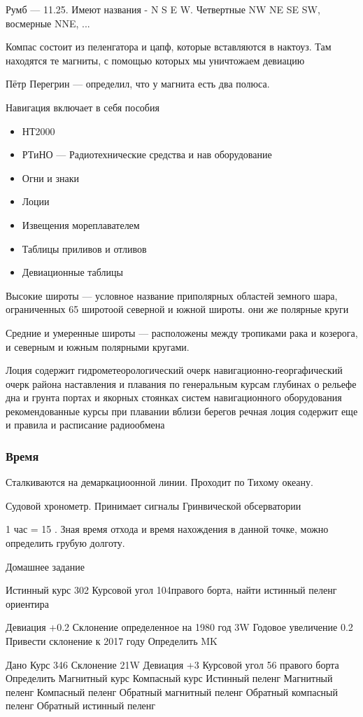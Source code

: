 \documentclass{article}        %
\begin{document}
Румб --- 11.25\degree . Имеют названия - N S E W. Четвертные NW NE SE SW, восмерные NNE, ...

Компас состоит из пеленгатора и цапф, которые вставляются в нактоуз. Там находятся те магниты, с помощью которых мы уничтожаем девиацию

Пётр Перегрин --- определил, что у магнита есть два полюса.

Навигация включает в себя пособия
\begin{itemize}
	\item НТ2000
	\item РТиНО --- Радиотехнические средства и нав оборудование
	\item Огни и знаки 
	\item Лоции
	\item Извещения мореплавателем
	\item Таблицы приливов и отливов
	\item Девиационные таблицы
\end{itemize}

Высокие широты --- условное название приполярных областей земного шара, 
	ограниченных 65 широтоой северной и южной широты. они же полярные круги

Средние и умеренные широты --- расположены между тропиками рака и козерога, 
	и северным и южным полярными кругами.

Лоция содержит
	гидрометеорологический очерк
	навигационно-георгафический очерк района
	наставления и плавания по генеральным курсам
		глубинах о рельефе дна и грунта
		портах и якорных стоянках
		систем навигационного оборудования
	рекомендованные курсы при плавании вблизи берегов
	речная лоция содержит еще и правила и расписание радиообмена

\subsubsection{Время}
Сталкиваются на демаркациоонной линии. Проходит по Тихому океану.

Судовой хронометр. Принимает сигналы Гринвической обсерватории

1 час = 15 \degree.
Зная время отхода и время нахождения в данной точке, можно определить грубую долготу.

Домашнее задание

Истинный курс 302\degree 
Курсовой угол 104\degree правого борта, 
найти истинный пеленг ориентира

Девиация +0.2\degree
Склонение определенное на 1980 год 3\degree W
Годовое увеличение 0.2\degree
Привести склонение к 2017 году
Определить \Delta MK

Дано
Курс 346\degree
Склонение 21\degree W
Девиация +3\degree 
Курсовой угол 56 \degree правого борта
Определить
	Магнитный курс
	Компасный курс
	Истинный пеленг
	Магнитный пеленг
	Компасный пеленг
	Обратный магнитный пеленг
	Обратный компасный пеленг
	Обратный истинный пеленг
\end{document}
